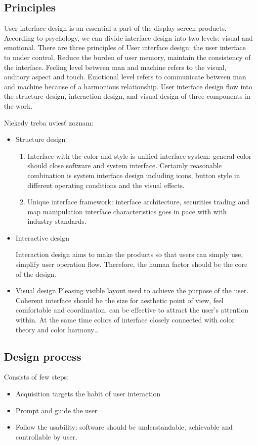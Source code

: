 \documentclass[10pt,twoside,english,a4paper]{article}
\begin{document}
\subsection{Principles} 
User interface design is an essential a part of the display screen products. According to psychology, we can divide interface design into two levels: visual and emotional. There are three principles of User interface design: the user interface to under control, Reduce the burden of user memory, maintain the consistency of the interface. Feeling level between man and machine refers to the visual, auditory aspect and touch. Emotional level refers to communicate between man and machine because of a harmonious relationship. User interface design flow into the structure design, interaction design, and visual design of three components in the work.

Niekedy treba uviesť zoznam:

\begin{itemize}
\item Structure design
\begin{enumerate}

\item Interface with the color and style is unified interface system: general color should close software and system interface. Certainly reasonable combination is system interface design including icons, button style in different operating conditions and the visual effects.
\item Unique interface framework: interface architecture, securities trading and map manipulation interface characteristics goes in pace with with industry standards.
	\end{enumerate}
\item Interactive design

Interaction design aims to make the products so that users can simply use, simplify user operation flow. Therefore, the human factor should be the core of the design.

\item Visual design
Pleasing visible layout used to achieve the purpose of the user. Coherent interface should be the size for aesthetic point of view, feel comfortable and coordination, can be effective to attract the user's attention within. At the same time colors of interface closely connected with color theory and color harmony…
\end{itemize}

\subsection{Design process}
Consists of few steps: 
\begin{itemize}
\item         Acquisition targets the habit of user interaction
\item        Prompt and guide the user
\item        Follow the usability: software should be understandable, achievable and controllable by user.
\end{itemize}
\end{document}
